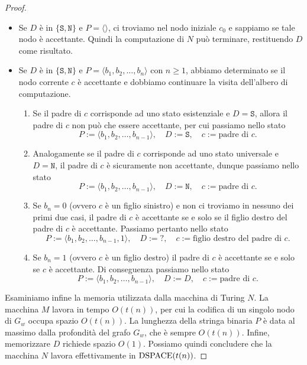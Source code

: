 \begin{proof}
\begin{itemize}
  \item Se $D$ è in $\{\texttt{S}, \texttt{N}\}$ e $P=\langle\rangle$, ci troviamo nel nodo iniziale $c_0$ e sappiamo se tale nodo è accettante. Quindi la computazione di $N$ può terminare, restituendo $D$ come risultato.
  
  \item Se $D$ è in $\{\texttt{S}, \texttt{N}\}$ e $P=\langle b_1, b_2, \ldots, b_n\rangle$ con $n\geq 1$, abbiamo determinato se il nodo corrente $c$ è accettante e dobbiamo continuare la visita dell'albero di computazione.
  \begin{enumerate}
    \item Se il padre di $c$ corrisponde ad uno stato esistenziale e $D=\texttt{S}$, allora il padre di $c$ non può che essere accettante, per cui passiamo nello stato
    \[ P := \langle b_1, b_2, \ldots, b_{n-1} \rangle, \quad D := \texttt{S}, \quad c := \text{padre di $c$}. \]
    
    \item Analogamente se il padre di $c$ corrisponde ad uno stato universale e $D=\texttt{N}$, il padre di $c$ è sicuramente non accettante, dunque passiamo nello stato
    \[ P := \langle b_1, b_2, \ldots, b_{n-1} \rangle, \quad D := \texttt{N}, \quad c := \text{padre di $c$}. \]
    
    \item Se $b_n=0$ (ovvero $c$ è un figlio sinistro) e non ci troviamo in nessuno dei primi due casi,
    il padre di $c$ è accettante se e solo se il figlio destro del padre di $c$ è accettante.
    Passiamo pertanto nello stato
    \[ P := \langle b_1, b_2, \ldots, b_{n-1}, 1 \rangle, \quad D := \texttt{?}, \quad c := \text{figlio destro del padre di $c$}. \]
    
    \item Se $b_n=1$ (ovvero $c$ è un figlio destro) il padre di $c$ è accettante se e solo se $c$ è accettante.
    Di conseguenza passiamo nello stato
    \[ P := \langle b_1, b_2, \ldots, b_{n-1} \rangle, \quad D := D, \quad c := \text{padre di $c$}. \]
  \end{enumerate}
 \end{itemize}

 Esaminiamo infine la memoria utilizzata dalla macchina di Turing $N$.
 La macchina $M$ lavora in tempo $O(t(n))$, per cui la codifica di un singolo nodo di $G_w$ occupa spazio $O(t(n))$.
 La lunghezza della stringa binaria $P$ è data al massimo dalla profondità del grafo $G_w$, che è sempre $O(t(n))$.
 Infine, memorizzare $D$ richiede spazio $O(1)$.
 Possiamo quindi concludere che la macchina $N$ lavora effettivamente in $\operatorname{DSPACE}(t(n))$.
 
\end{proof}


